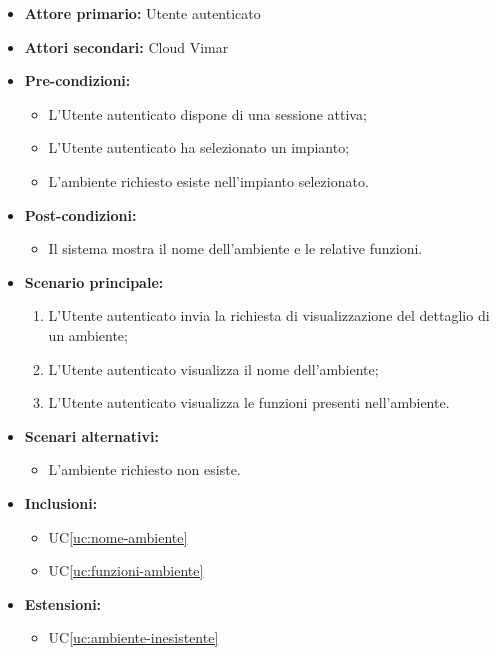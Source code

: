 \documentclass[11pt, a4paper]{article}
\newcounter{uc}                            %
\newcommand{\ucref}[1]{UC\ref{uc:#1}}
\begin{document}
\begin{itemize}[label=\textbullet]
  \item \textbf{Attore primario:} Utente autenticato
  \item \textbf{Attori secondari:} Cloud Vimar
  \item \textbf{Pre-condizioni:}
  \begin{itemize}[label=‣]
    \item L'Utente autenticato dispone di una sessione attiva;
    \item L'Utente autenticato ha selezionato un impianto;
    \item L'ambiente richiesto esiste nell'impianto selezionato.
  \end{itemize}
  \item \textbf{Post-condizioni:}
  \begin{itemize}[label=‣]
    \item Il sistema mostra il nome dell'ambiente e le relative funzioni.
  \end{itemize}
  \item \textbf{Scenario principale:}
  \begin{enumerate}
    \item L'Utente autenticato invia la richiesta di visualizzazione del dettaglio di un ambiente;
    \item L'Utente autenticato visualizza il nome dell'ambiente;
    \item L'Utente autenticato visualizza le funzioni presenti nell'ambiente.
  \end{enumerate}
  \item \textbf{Scenari alternativi:}
  \begin{itemize}[label=‣]
    \item L'ambiente richiesto non esiste.
  \end{itemize}
  \item \textbf{Inclusioni:}
  \begin{itemize}[label=‣]
    \item \ucref{nome-ambiente}
    \item \ucref{funzioni-ambiente}
  \end{itemize}
  \item \textbf{Estensioni:}
  \begin{itemize}[label=‣]
    \item \ucref{ambiente-inesistente}
  \end{itemize}
\end{itemize}
\end{document}
